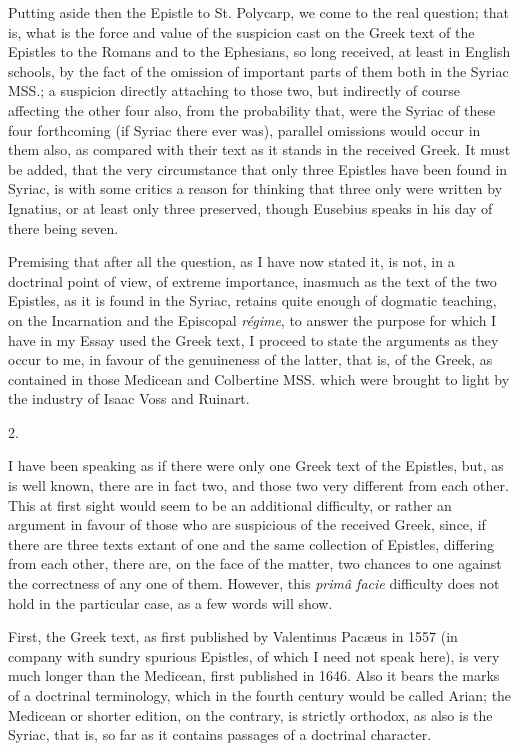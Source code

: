 Putting aside then the Epistle
to St. Polycarp, we come to the real question; that is, what is the
force and value of the suspicion cast on the Greek text of the
Epistles to the Romans and to the Ephesians, so long received, at
least in English schools, by the fact of the omission of important
parts of them both in the Syriac MSS.; a suspicion directly attaching
to those two, but indirectly of course affecting the other four also,
from the probability that, were the Syriac of these four forthcoming
(if Syriac there ever was), parallel omissions would occur in them
also, as compared with their text as it stands in the received Greek.
It must be added, that the very circumstance that only three Epistles
have been found in Syriac, is with some critics a reason for thinking
that three only were written by Ignatius, or at least only three
preserved, though Eusebius speaks in his day of there being seven.

Premising that after all the
question, as I have now stated it, is not, in a doctrinal point of
view, of extreme importance, inasmuch as the text of the two Epistles,
as it is found in the Syriac, retains quite enough of dogmatic
teaching, on the Incarnation and the Episcopal \emph{régime}, to
answer the purpose for which I have in my Essay used the Greek text, I
proceed to state the arguments as they occur to me, in favour of the
genuineness of the latter, that is, of the Greek, as contained in
those Medicean and Colbertine MSS. which were brought to light by the
industry of Isaac Voss and Ruinart.

2.

I have been speaking as if
there were only one Greek text of the Epistles, but, as is well
known, there are in fact two, and those two very different from each
other. This at first sight would seem to be an additional difficulty,
or rather an argument in favour of those who are suspicious of the
received Greek, since, if there are three texts extant of one and the
same collection of Epistles, differing from each other, there are, on
the face of the matter, two chances to one against the correctness of
any one of them. However, this \emph{primâ facie} difficulty does not
hold in the particular case, as a few words will show.

First, the Greek text, as
first published by Valentinus Pacæus in 1557 (in company with sundry
spurious Epistles, of which I need not speak here), is very much
longer than the Medicean, first published in 1646. Also it bears the
marks of a doctrinal terminology, which in the fourth century would be
called Arian; the Medicean or shorter edition, on the contrary, is
strictly orthodox, as also is the Syriac, that is, so far as it
contains passages of a doctrinal character.

